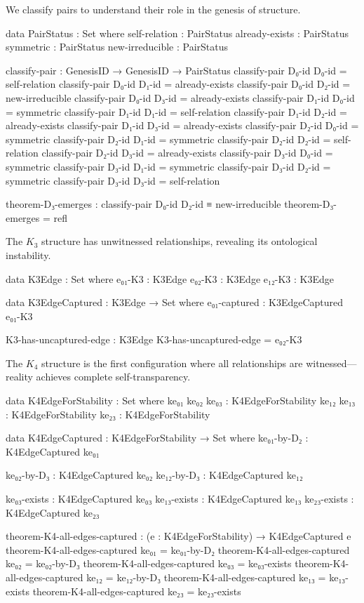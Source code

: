 \documentclass[11pt,a4paper]{book}
\begin{document}
We classify pairs to understand their role in the genesis of structure.

\begin{code}
data PairStatus : Set where
  self-relation   : PairStatus
  already-exists  : PairStatus
  symmetric       : PairStatus
  new-irreducible : PairStatus

classify-pair : GenesisID → GenesisID → PairStatus
classify-pair D₀-id D₀-id = self-relation
classify-pair D₀-id D₁-id = already-exists
classify-pair D₀-id D₂-id = new-irreducible
classify-pair D₀-id D₃-id = already-exists
classify-pair D₁-id D₀-id = symmetric
classify-pair D₁-id D₁-id = self-relation
classify-pair D₁-id D₂-id = already-exists
classify-pair D₁-id D₃-id = already-exists
classify-pair D₂-id D₀-id = symmetric
classify-pair D₂-id D₁-id = symmetric
classify-pair D₂-id D₂-id = self-relation
classify-pair D₂-id D₃-id = already-exists
classify-pair D₃-id D₀-id = symmetric
classify-pair D₃-id D₁-id = symmetric
classify-pair D₃-id D₂-id = symmetric
classify-pair D₃-id D₃-id = self-relation

theorem-D₃-emerges : classify-pair D₀-id D₂-id ≡ new-irreducible
theorem-D₃-emerges = refl
\end{code}

The $K_3$ structure has unwitnessed relationships, revealing its ontological instability.

\begin{code}
data K3Edge : Set where
  e₀₁-K3 : K3Edge
  e₀₂-K3 : K3Edge
  e₁₂-K3 : K3Edge

data K3EdgeCaptured : K3Edge → Set where
  e₀₁-captured : K3EdgeCaptured e₀₁-K3

K3-has-uncaptured-edge : K3Edge
K3-has-uncaptured-edge = e₀₂-K3
\end{code}

The $K_4$ structure is the first configuration where all relationships are witnessed—reality achieves complete self-transparency.

\begin{code}
data K4EdgeForStability : Set where
  ke₀₁ ke₀₂ ke₀₃ : K4EdgeForStability
  ke₁₂ ke₁₃ : K4EdgeForStability
  ke₂₃ : K4EdgeForStability

data K4EdgeCaptured : K4EdgeForStability → Set where
  ke₀₁-by-D₂ : K4EdgeCaptured ke₀₁
  
  ke₀₂-by-D₃ : K4EdgeCaptured ke₀₂
  ke₁₂-by-D₃ : K4EdgeCaptured ke₁₂
  
  ke₀₃-exists : K4EdgeCaptured ke₀₃
  ke₁₃-exists : K4EdgeCaptured ke₁₃
  ke₂₃-exists : K4EdgeCaptured ke₂₃

theorem-K4-all-edges-captured : (e : K4EdgeForStability) → K4EdgeCaptured e
theorem-K4-all-edges-captured ke₀₁ = ke₀₁-by-D₂
theorem-K4-all-edges-captured ke₀₂ = ke₀₂-by-D₃
theorem-K4-all-edges-captured ke₀₃ = ke₀₃-exists
theorem-K4-all-edges-captured ke₁₂ = ke₁₂-by-D₃
theorem-K4-all-edges-captured ke₁₃ = ke₁₃-exists
theorem-K4-all-edges-captured ke₂₃ = ke₂₃-exists
\end{code}
\end{document}
